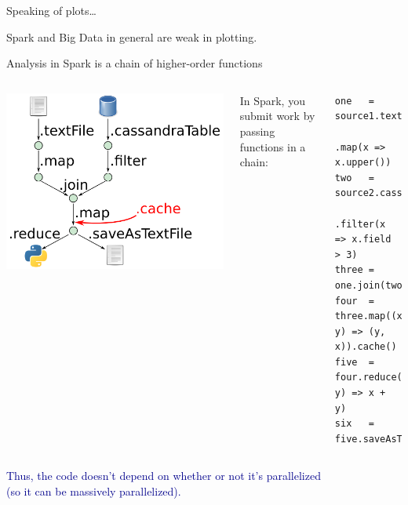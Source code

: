 \documentclass[aspectratio=169]{beamer}
\begin{document}
\begin{frame}{Speaking of plots\ldots}
\vspace{0.5 cm}
\begin{center}
\LARGE Spark and Big Data in general are weak in plotting.

\vspace{1 cm}

\vspace{1 cm}
\end{center}
\end{frame}

\begin{frame}[fragile]{Analysis in Spark is a chain of higher-order functions}
\vspace{1 cm}
\begin{columns}
\includegraphics[width=\linewidth]{spark-dag.png}

In Spark, you submit work by passing functions in a chain:

\small
\begin{verbatim}
one   = source1.textFile("some.txt")
               .map(x => x.upper())
two   = source2.cassandraTable
               .filter(x => x.field > 3)
three = one.join(two)
four  = three.map((x, y) => (y, x)).cache()
five  = four.reduce((x, y) => x + y)
six   = five.saveAsTextFile("other.txt")
\end{verbatim}
\end{columns}

\vspace{0.5 cm}
\begin{center}
\textcolor{darkblue}{\large Thus, the code doesn't depend on whether or not it's parallelized \\ (so it can be massively parallelized).}
\end{center}
\end{frame}
\end{document}
